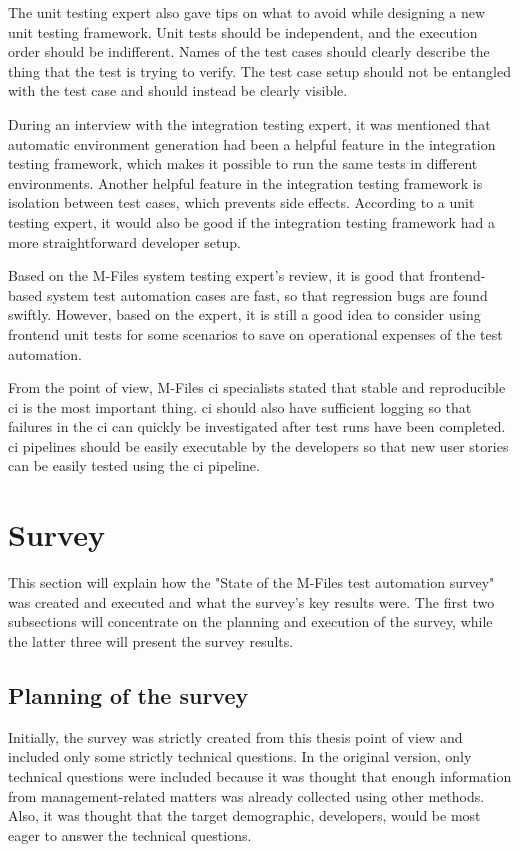 The unit testing expert also gave tips on what to avoid while designing a new unit testing framework. Unit tests should be independent, and the execution order should be indifferent. Names of the test cases should clearly describe the thing that the test is trying to verify. The test case setup should not be entangled with the test case and should instead be clearly visible.

During an interview with the integration testing expert, it was mentioned that automatic environment generation had been a helpful feature in the integration testing framework, which makes it possible to run the same tests in different environments. Another helpful feature in the integration testing framework is isolation between test cases, which prevents side effects. According to a unit testing expert, it would also be good if the integration testing framework had a more straightforward developer setup.

Based on the M-Files system testing expert's review, it is good that frontend-based system test automation cases are fast, so that regression bugs are found swiftly. However, based on the expert, it is still a good idea to consider using frontend unit tests for some scenarios to save on operational expenses of the test automation.

From the  point of view, M-Files \gls{ci} specialists stated that stable and reproducible \gls{ci} is the most important thing. \gls{ci} should also have sufficient logging so that failures in the \gls{ci} can quickly be investigated after test runs have been completed. \gls{ci} pipelines should be easily executable by the developers so that new user stories can be easily tested using the \gls{ci} pipeline.

\section{Survey}
This section will explain how the "State of the M-Files test automation survey" was created and executed and what the survey's key results were. The first two subsections will concentrate on the planning and execution of the survey, while the latter three will present the survey results.

\subsection{Planning of the survey}
Initially, the survey was strictly created from this thesis point of view and included only some strictly technical questions. In the original version, only technical questions were included because it was thought that enough information from management-related matters was already collected using other methods. Also, it was thought that the target demographic, developers, would be most eager to answer the technical questions.

